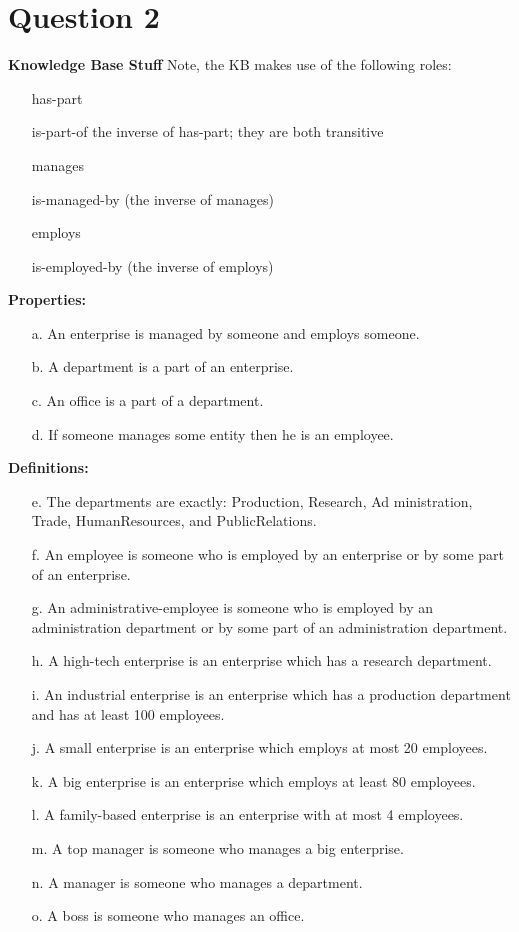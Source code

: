 \documentclass[11pt]{article}
\begin{document}
\section{Question 2}
\textbf{Knowledge Base Stuff} 
Note, the KB makes use of the following roles:

\begin{itemize}
    \item[] has-part
    \item[] is-part-of the inverse of has-part; they are both transitive
    \item[] manages
    \item[] is-managed-by (the inverse of manages)
    \item[] employs
    \item[] is-employed-by (the inverse of employs)
\end{itemize}

\noindent\textbf{Properties:}
\begin{itemize}
    \item[a.] An enterprise is managed by someone and employs someone.
    \item[b.] A department is a part of an enterprise.
    \item[c.] An office is a part of a department.
    \item[d.] If someone manages some entity then he is an employee.
\end{itemize} 

\noindent\textbf{Definitions:}

\begin{itemize}
    \item[e.] The departments are exactly: Production, Research, Ad
ministration, Trade, HumanResources, and PublicRelations.
\item[f.] An employee is someone who is employed by an enterprise or by some part of an enterprise.
\item[g.] An administrative-employee is someone who is employed by an administration department or by some part of an administration department.
\item[h.] A high-tech enterprise is an enterprise which has a research department.
\item[i.] An industrial enterprise is an enterprise which has a production department and has at least 100 employees.
\item[j.] A small enterprise is an enterprise which employs at most 20 employees.
\item[k.] A big enterprise is an enterprise which employs at least 80 employees.
\item[l.] A family-based enterprise is an enterprise with at most 4 employees.
\item[m.] A top manager is someone who manages a big enterprise.
\item[n.] A manager is someone who manages a department.
\item[o.] A boss is someone who manages an office.
\end{itemize}
\end{document}
